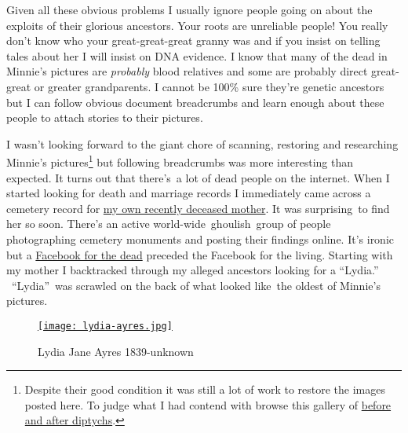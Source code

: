 Given all these obvious problems I usually ignore people going on about
the exploits of their glorious ancestors. Your roots are unreliable
people! You really don't know who your great-great-great granny was and
if you insist on telling tales about her I will insist on DNA evidence.
I know that many of the dead in Minnie's pictures are \emph{probably}
blood relatives and some are probably direct great-great or greater
grandparents. I cannot be 100\% sure they're genetic ancestors but I can
follow obvious document breadcrumbs and learn enough about these people
to attach stories to their pictures.

I wasn't looking forward to the giant chore of scanning, restoring and
researching Minnie's pictures\footnote{
Despite their good condition it was still a lot of work to restore the
images posted here. To judge what I had contend with browse this
gallery of  \href{http://conceptcontrol.smugmug.com/Themes/Manipulations/Restorations-1}{before
and after diptychs}.
}  but
following breadcrumbs was more interesting than expected. It turns out
that there's~a lot of dead people on the internet. When I started
looking for death and marriage records I immediately came across a
cemetery record for
\href{http://www.findagrave.com/cgi-bin/fg.cgi?page=gr\&GSln=baker\&GSfn=evelyn+\&GSmn=v\&GSbyrel=all\&GSdyrel=all\&GSst=28\&GScnty=1627\&GScntry=4\&GSob=n\&GRid=110246189\&df=all\&}{my
own recently deceased mother}. It was surprising~to find her so soon.
There's an active world-wide~ghoulish~group of people photographing
cemetery monuments and posting their findings online. It's ironic but a
\href{http://en.wikipedia.org/wiki/Find\_a\_Grave}{Facebook for the
dead} preceded the Facebook for the living. Starting with my mother I
backtracked through my alleged ancestors looking for a ``Lydia.''
~``Lydia''~was scrawled on the back of what looked like~the oldest of
Minnie's pictures.



\begin{SCfigure}
\centering
\href{http://conceptcontrol.smugmug.com/People/Minnie-Raver/i-FWtqBg4/A}{\texttt{[image: lydia-ayres.jpg]}}
\caption{Lydia Jane Ayres 1839-unknown}
\label{fig:4230X2}
\end{SCfigure}

